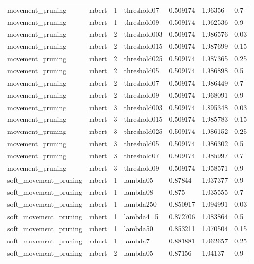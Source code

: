 \begin{tabular}{lllllll}
     movement\_pruning & mbert &   1 &  threshold07 &  0.509174 &   1.96356 &    0.7 \\
     movement\_pruning & mbert &   1 &  threshold09 &  0.509174 &  1.962536 &    0.9 \\
     movement\_pruning & mbert &   2 & threshold003 &  0.509174 &  1.986576 &   0.03 \\
     movement\_pruning & mbert &   2 & threshold015 &  0.509174 &  1.987699 &   0.15 \\
     movement\_pruning & mbert &   2 & threshold025 &  0.509174 &  1.987365 &   0.25 \\
     movement\_pruning & mbert &   2 &  threshold05 &  0.509174 &  1.986898 &    0.5 \\
     movement\_pruning & mbert &   2 &  threshold07 &  0.509174 &  1.986449 &    0.7 \\
     movement\_pruning & mbert &   2 &  threshold09 &  0.509174 &  1.968091 &    0.9 \\
     movement\_pruning & mbert &   3 & threshold003 &  0.509174 &  1.895348 &   0.03 \\
     movement\_pruning & mbert &   3 & threshold015 &  0.509174 &  1.985783 &   0.15 \\
     movement\_pruning & mbert &   3 & threshold025 &  0.509174 &  1.986152 &   0.25 \\
     movement\_pruning & mbert &   3 &  threshold05 &  0.509174 &  1.986302 &    0.5 \\
     movement\_pruning & mbert &   3 &  threshold07 &  0.509174 &  1.985997 &    0.7 \\
     movement\_pruning & mbert &   3 &  threshold09 &  0.509174 &  1.958571 &    0.9 \\
soft\_movement\_pruning & mbert &   1 &     lambda05 &   0.87844 &  1.037377 &    0.9 \\
soft\_movement\_pruning & mbert &   1 &     lambda08 &     0.875 &  1.035555 &    0.7 \\
soft\_movement\_pruning & mbert &   1 &    lambda250 &  0.850917 &  1.094991 &   0.03 \\
soft\_movement\_pruning & mbert &   1 &    lambda4\_5 &  0.872706 &  1.083864 &    0.5 \\
soft\_movement\_pruning & mbert &   1 &     lambda50 &  0.853211 &  1.070504 &   0.15 \\
soft\_movement\_pruning & mbert &   1 &      lambda7 &  0.881881 &  1.062657 &   0.25 \\
soft\_movement\_pruning & mbert &   2 &     lambda05 &   0.87156 &   1.04137 &    0.9 \\

\end{tabular}
